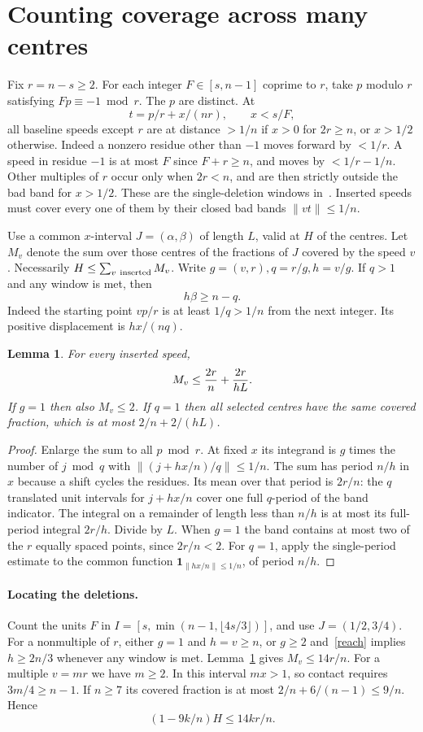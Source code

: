 \documentclass[11pt,a4paper]{article}
\newtheorem{lem}[thm]{Lemma}
\newcommand{\dist}[1]{\lVert#1\rVert}
\begin{document}
\section{Counting coverage across many centres}
Fix $r=n-s\ge2$. For each integer $F\in[s,n-1]$ coprime to $r$, take $p$ modulo $r$ satisfying $Fp\equiv-1\bmod r$. The $p$ are distinct. At
\[
 t=p/r+x/(nr),\qquad x<s/F ,
\]
all baseline speeds except $r$ are at distance $>1/n$ if $x>0$ for $2r\ge n$, or $x>1/2$ otherwise. Indeed a nonzero residue other than $-1$ moves forward by $<1/r$. A speed in residue $-1$ is at most $F$ since $F+r\ge n$, and moves by $<1/r-1/n$. Other multiples of $r$ occur only when $2r<n$, and are then strictly outside the bad band for $x>1/2$. These are the single-deletion windows in~\cite[Sec.~2]{Z}. Inserted speeds must cover every one of them by their closed bad bands $\dist{vt}\le1/n$.

Use a common $x$-interval $J=(\alpha,\beta)$ of length $L$, valid at $H$ of the centres. Let $M_v$ denote the sum over those centres of the fractions of $J$ covered by the speed $v$. Necessarily $H\le\sum_{v\ {\rm inserted}}M_v$. Write $g=(v,r),q=r/g,h=v/g$. If $q>1$ and any window is met, then
\begin{equation}\label{reach}
 h\beta\ge n-q .
\end{equation}
Indeed the starting point $vp/r$ is at least $1/q>1/n$ from the next integer. Its positive displacement is $hx/(nq)$.
\begin{lem}\label{average}
For every inserted speed,
\[
 M_v\le {2r\over n}+{2r\over hL}.
\]
If $g=1$ then also $M_v\le2$. If $q=1$ then all selected centres have the same covered fraction, which is at most $2/n+2/(hL)$.
\end{lem}
\begin{proof}
Enlarge the sum to all $p\bmod r$. At fixed $x$ its integrand is $g$ times the number of $j\bmod q$ with $\dist{(j+hx/n)/q}\le1/n$. The sum has period $n/h$ in $x$ because a shift cycles the residues. Its mean over that period is $2r/n$: the $q$ translated unit intervals for $j+hx/n$ cover one full $q$-period of the band indicator. The integral on a remainder of length less than $n/h$ is at most its full-period integral $2r/h$. Divide by $L$. When $g=1$ the band contains at most two of the $r$ equally spaced points, since $2r/n<2$. For $q=1$, apply the single-period estimate to the common function $\mathbf1_{\dist{hx/n}\le1/n}$, of period $n/h$.
\end{proof}

\paragraph{Locating the deletions.}
Count the units $F$ in $I=[s,\min(n-1,\lfloor4s/3\rfloor)]$, and use $J=(1/2,3/4)$. For a nonmultiple of $r$, either $g=1$ and $h=v\ge n$, or $g\ge2$ and~\eqref{reach} implies $h\ge2n/3$ whenever any window is met. Lemma~\ref{average} gives $M_v\le14r/n$. For a multiple $v=mr$ we have $m\ge2$. In this interval $mx>1$, so contact requires $3m/4\ge n-1$. If $n\ge7$ its covered fraction is at most $2/n+6/(n-1)\le9/n$. Hence
\begin{equation}\label{mid}
 (1-9k/n)H\le14kr/n .
\end{equation}
\end{document}
